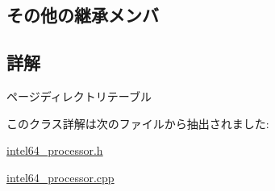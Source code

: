 \subsection*{その他の継承メンバ}


\subsection{詳解}
ページディレクトリテーブル 

このクラス詳解は次のファイルから抽出されました\+:\begin{DoxyCompactItemize}
\item 
\hyperlink{intel64__processor_8h}{intel64\+\_\+processor.\+h}\item 
\hyperlink{intel64__processor_8cpp}{intel64\+\_\+processor.\+cpp}\end{DoxyCompactItemize}
